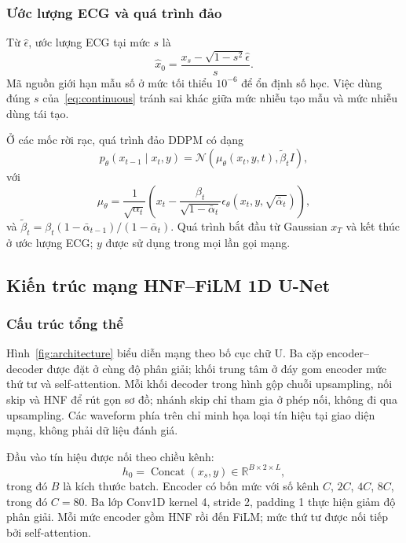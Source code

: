 \documentclass[conference]{IEEEtran}
\DeclareMathOperator{\Concat}{Concat}
\begin{document}
\subsubsection{Ước lượng ECG và quá trình đảo}
Từ $\hat\epsilon$, ước lượng ECG tại mức $s$ là
\begin{equation}
 \hat x_0=\frac{x_s-\sqrt{1-s^2}\hat\epsilon}{s}.
 \label{eq:x0}
\end{equation}
Mã nguồn giới hạn mẫu số ở mức tối thiểu $10^{-6}$ để ổn định số học. Việc dùng đúng $s$ của~\eqref{eq:continuous} tránh sai khác giữa mức nhiễu tạo mẫu và mức nhiễu dùng tái tạo.

Ở các mốc rời rạc, quá trình đảo DDPM có dạng
\begin{equation}
 p_\theta(x_{t-1}\mid x_t,y)=
 \mathcal{N}\!\left(\mu_\theta(x_t,y,t),\tilde\beta_t I\right),
\end{equation}
với
\begin{equation}
 \mu_\theta=\frac{1}{\sqrt{\alpha_t}}
 \left(x_t-\frac{\beta_t}{\sqrt{1-\bar\alpha_t}}
 \epsilon_\theta(x_t,y,\sqrt{\bar\alpha_t})\right),
\end{equation}
và $\tilde\beta_t=\beta_t(1-\bar\alpha_{t-1})/(1-\bar\alpha_t)$. Quá trình bắt đầu từ Gaussian $x_T$ và kết thúc ở ước lượng ECG; $y$ được sử dụng trong mọi lần gọi mạng.

\subsection{Kiến trúc mạng HNF--FiLM 1D U-Net}
\subsubsection{Cấu trúc tổng thể}
Hình~\ref{fig:architecture} biểu diễn mạng theo bố cục chữ U. Ba cặp encoder--decoder được đặt ở cùng độ phân giải; khối trung tâm ở đáy gom encoder mức thứ tư và self-attention. Mỗi khối decoder trong hình gộp chuỗi upsampling, nối skip và HNF để rút gọn sơ đồ; nhánh skip chỉ tham gia ở phép nối, không đi qua upsampling. Các waveform phía trên chỉ minh họa loại tín hiệu tại giao diện mạng, không phải dữ liệu đánh giá.

Đầu vào tín hiệu được nối theo chiều kênh:
\begin{equation}
 h_0=\Concat(x_s,y)\in\mathbb{R}^{B\times2\times L},
\end{equation}
trong đó $B$ là kích thước batch. Encoder có bốn mức với số kênh $C$, $2C$, $4C$, $8C$, trong đó $C=80$. Ba lớp Conv1D kernel 4, stride 2, padding 1 thực hiện giảm độ phân giải. Mỗi mức encoder gồm HNF rồi đến FiLM; mức thứ tư được nối tiếp bởi self-attention.
\end{document}

